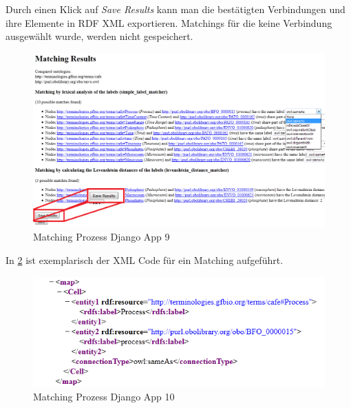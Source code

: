 		\pagebreak[4]
		Durch einen Klick auf \textit{Save Results} kann man die bestätigten
		Verbindungen und ihre Elemente in RDF XML exportieren. Matchings für die keine
		Verbindung ausgewählt wurde, werden nicht gespeichert.
		\begin{figure}[h!]
		\centering
		\includegraphics[width=1.0\textwidth]{pics/SimpleOntologyMatcher-Process10.png}
		\caption{Matching Prozess Django App 9}
		\label{fig13}
		\end{figure}
		
		\pagebreak[4]
		In \ref{fig14} ist exemplarisch der XML Code für ein Matching aufgeführt.
		\begin{figure}[h!]
		\centering
		\includegraphics[width=1.0\textwidth]{pics/SimpleOntologyMatcher-Process11.png}
		\caption{Matching Prozess Django App 10}
		\label{fig14}
		\end{figure}
		\pagebreak[4]
		
